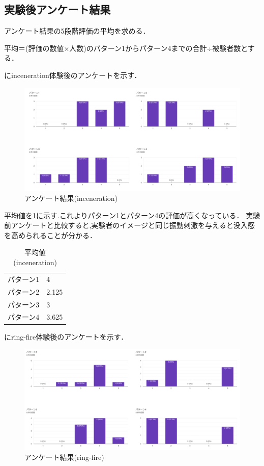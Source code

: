 \newpage

\subsection{実験後アンケート結果}
アンケート結果の5段階評価の平均を求める．

平均＝(評価の数値×人数)のパターン1からパターン4までの合計÷被験者数とする．

にinceneration体験後のアンケートを示す．

\begin{figure}[h]
  \centering
  \includegraphics[clip,width=14cm]{./fig/incenerationAnk.png}
  \caption{アンケート結果(inceneration)}\label{inceAnk}
  \end{figure}
  


平均値を\ref{tab;inceAvera}に示す.これよりパターン1とパターン4の評価が高くなっている．
実験前アンケートと比較すると,実験者のイメージと同じ振動刺激を与えると没入感を高められることが分かる．
\begin{table}[h]
    \caption{平均値(inceneration)}
    \centering
    \begin{tabular}{l|l}
    \hline
    \hline
    パターン1 & 4\\
    パターン2 & 2.125\\
    パターン3 & 3\\
    パターン4 & 3.625\\
    \hline
    \end{tabular}
    \label{tab;inceAvera}
\end{table}

にring-fire体験後のアンケートを示す．

\begin{figure}[h]
  \centering
  \includegraphics[clip,width=14cm]{fig/ringfireAnk.png}
  \caption{アンケート結果(ring-fire)}\label{ringAnk}
  \end{figure}


